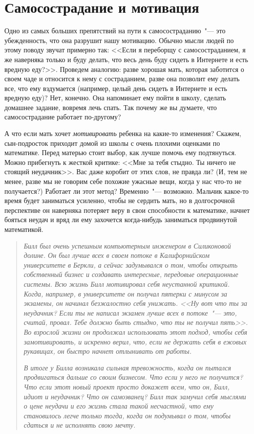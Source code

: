
\chapter{Самосострадание и мотивация} \label{Self-Compassionate_Motivation}

Одно из самых больших препятствий на пути к самосостраданию~"--- это убежденность, что она разрушит нашу мотивацию. Обычно мысли людей по этому поводу звучат примерно так: <<Если я переборщу с самосостраданием, я же наверняка только и буду делать, что весь день буду сидеть в Интернете и есть вредную еду?>>\cite{72}. Проведем аналогию: разве хорошая мать, которая заботится о своем чаде и относится к нему с состраданием, разве она позволит ему делать все, что ему вздумается (например, целый день сидеть в Интернете и есть вредную еду)? Нет, конечно. Она напоминает ему пойти в школу, сделать домашнее задание, вовремя лечь спать. Так почему же вы думаете, что самосострадание работает по-другому? 

А что если мать хочет \emph{мотивировать} ребенка на какие-то изменения? Скажем, сын-подросток приходит домой из школы с очень плохими оценками по математике. Перед матерью стоит выбор, как лучше помочь ему подтянуться. Можно прибегнуть к жесткой критике: <<Мне за тебя стыдно. Ты ничего не стоящий неудачник>>. Вас даже коробит от этих слов, не правда ли? (И, тем не менее, разве мы не говорим себе похожие ужасные вещи, когда у нас что-то не получается?) Работает ли этот метод? Временно~"--- возможно. Мальчик какое-то время будет заниматься усиленно, чтобы не сердить мать, но в долгосрочной перспективе он наверняка потеряет веру в свои способности к математике, начнет бояться неудач и вряд ли ему захочется когда-нибудь заниматься продвинутой математикой. 

\begin{quotation}
	\textit{
		Билл был очень успешным компьютерным инженером в Силиконовой долине. Он был лучше всех в своем потоке в Калифорнийском университете в Беркли, а сейчас задумывался о том, чтобы открыть собственный бизнес и создавать интересные, передовые операционные системы. Всю жизнь Билл мотивировал себя неустанной критикой. Когда, например, в университете он получал пятерки с минусом за экзамены, он начинал безжалостно себя унижать. <<Ну вот что ты за неудачник? Если ты не написал экзамен лучше всех в потоке~"--- это, считай, провал. Тебе должно быть стыдно, что ты не получил пять>>. Во взрослой жизни он продолжал использовать этот подход, чтобы себя замотивировать, и искренно верил, что, если не держать себя в ежовых рукавицах, он быстро начнет отлынивать от работы.
	}

	\textit{	
		В итоге у Билла возникала сильная тревожность, когда он пытался продвигаться дальше со своим бизнесом. Что если у него не получится? Что если этот новый проект просто докажет всем, что он, Билл, идиот и неудачник? Что он самозванец? Билл так замучил себя мыслями о цене неудачи и его жизнь стала такой несчастной, что ему становилось легче только тогда, когда он подумывал о том, чтобы сдаться и не исполнять свою мечту.
	}
\end{quotation}


